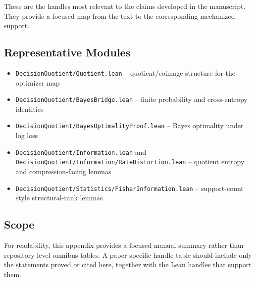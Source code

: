 These are the handles most relevant to the claims developed in the manuscript. They provide a focused map from the text to the corresponding mechanized support.

\subsection{Representative Modules}

\begin{itemize}
\item \texttt{DecisionQuotient/Quotient.lean} -- quotient/coimage structure for the optimizer map
\item \texttt{DecisionQuotient/BayesBridge.lean} -- finite probability and cross-entropy identities
\item \texttt{DecisionQuotient/BayesOptimalityProof.lean} -- Bayes optimality under log loss
\item \texttt{DecisionQuotient/Information.lean} and \texttt{DecisionQuotient/Information/RateDistortion.lean} -- quotient entropy and compression-facing lemmas
\item \texttt{DecisionQuotient/Statistics/FisherInformation.lean} -- support-count style structural-rank lemmas
\end{itemize}

\subsection{Scope}

For readability, this appendix provides a focused manual summary rather than repository-level omnibus tables. A paper-specific handle table should include only the statements proved or cited here, together with the Lean handles that support them.
